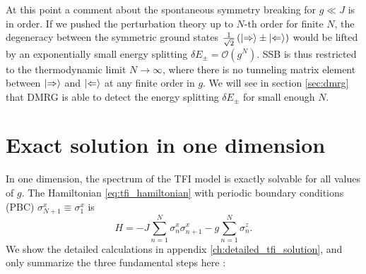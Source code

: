 \vspace*{1em}
\noindent At this point a comment about the spontaneous symmetry breaking for $g \ll J$ is in order. If we pushed the perturbation theory up to $N$-th order for finite $N$, the degeneracy between the symmetric ground states $\frac{1}{\sqrt{2}} \left( \ket{\Rightarrow} \pm \ket{\Leftarrow} \right)$ would be lifted by an exponentially small energy splitting $\delta E_{\pm} = \mathcal{O}(g^N)$. SSB is thus restricted to the thermodynamic limit $N \to \infty$, where there is no tunneling matrix element between $\ket{\Rightarrow}$ and $\ket{\Leftarrow}$ at any finite order in $g$. We will see in section \ref{sec:dmrg} that DMRG is able to detect the energy splitting $\delta E_{\pm}$ for small enough $N$.


\section{Exact solution in one dimension} \label{sec:tfi_exact_solution}
\noindent In one dimension, the spectrum of the TFI model is exactly solvable for all values of $g$. The Hamiltonian \eqref{eq:tfi_hamiltonian} with periodic boundary conditions (PBC) $\sigma^x_{N+1} \equiv \sigma^x_1$ is
\begin{equation} \label{eq_ising_hamiltonian_1d}
	H = -J \sum_{n=1}^N \sigma^x_n \sigma^x_{n+1} - g \sum_{n=1}^N \sigma^z_n.
\end{equation}
We show the detailed calculations in appendix \ref{ch:detailed_tfi_solution}, and only summarize the three fundamental steps here \cite{pfeuty1970one, sachdev2011quantum}:
